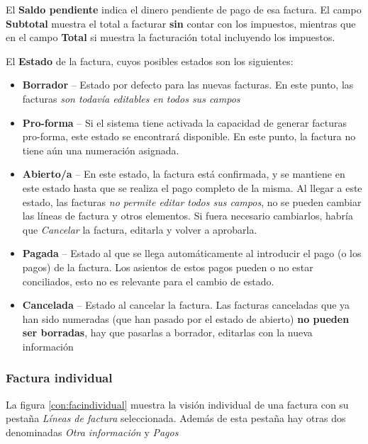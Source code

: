 El \textbf{Saldo pendiente} indica el dinero pendiente de pago de esa factura. El campo \textbf{Subtotal} muestra el total a facturar \textbf{sin} contar con los impuestos, mientras que en el campo \textbf{Total} si muestra la facturación total incluyendo los impuestos.

El \textbf{Estado} de la factura, cuyos posibles estados son los siguientes:

\begin{itemize}
  \item \textbf{Borrador} -- Estado por defecto para las nuevas facturas. En este punto, las facturas \emph{son todavía editables en todos sus
                             campos}
  \item \textbf{Pro-forma} -- Si el sistema tiene activada la capacidad de generar facturas pro-forma, este estado se encontrará disponible. En
                             este punto, la factura no tiene aún una numeración asignada.
  \item \textbf{Abierto/a} -- En este estado, la factura está confirmada, y se mantiene en este estado hasta que se realiza el pago completo
                             de la misma. Al llegar a este estado, las facturas \emph{no permite editar todos sus campos}, no se pueden cambiar
                             las líneas de factura y otros elementos. Si fuera necesario cambiarlos, habría que \emph{Cancelar} la factura, editarla
                             y volver a aprobarla.
  \item \textbf{Pagada} -- Estado al que se llega automáticamente al introducir el pago (o los pagos) de la factura. Los asientos de estos pagos pueden
                           o no estar conciliados, esto no es relevante para el cambio de estado.
  \item \textbf{Cancelada} -- Estado al cancelar la factura. Las facturas canceladas que ya han sido numeradas (que han pasado por el estado de
                           abierto) \textbf{no pueden ser borradas}, hay que pasarlas a borrador, editarlas con la nueva información
\end{itemize}


\subsubsection{Factura individual}

La figura \ref{con:facindividual} muestra la visión individual de una factura con su pestaña \emph{Líneas de factura} seleccionada. Además de esta pestaña hay otras dos denominadas \emph{Otra información} y \emph{Pagos}

